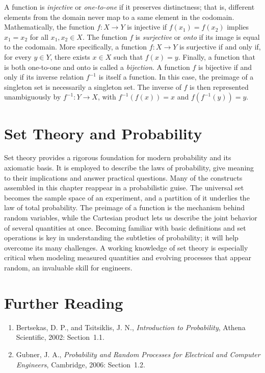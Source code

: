 A function is \emph{injective} or \emph{one-to-one} if it preserves distinctness;
that is, different elements from the domain never map to a same element in the codomain.
Mathematically, the function $f: X \rightarrow Y$ is injective if $f(x_1) = f(x_2)$ implies $x_1 = x_2$ for all $x_1, x_2 \in X$.
The function $f$ is \emph{surjective} or \emph{onto} if its image is equal to the codomain.
More specifically, a function $f: X \rightarrow Y$ is surjective if and only if, for every $y \in Y$, there exists $x \in X$ such that $f(x) = y$.
Finally, a function that is both one-to-one and onto is called a \emph{bijection}.
A function $f$ is bijective if and only if its inverse relation $f^{-1}$ is itself a function.
In this case, the preimage of a singleton set is necessarily a singleton set.
The inverse of $f$ is then represented unambiguously by $f^{-1}: Y \rightarrow X$,
with $f^{-1} (f(x)) = x$ and $f (f^{-1} (y)) = y$.


\section{Set Theory and Probability}

Set theory provides a rigorous foundation for modern probability and its axiomatic basis.
It is employed to describe the laws of probability, give meaning to their implications and answer practical questions.
Many of the constructs assembled in this chapter reappear in a probabilistic guise.
The universal set becomes the sample space of an experiment, and a partition of it underlies the law of total probability.
The preimage of a function is the mechanism behind random variables, while the Cartesian product lets us describe the joint behavior of several quantities at once.
Becoming familiar with basic definitions and set operations is key in understanding the subtleties of probability; it will help overcome its many challenges.
A working knowledge of set theory is especially critical when modeling measured quantities and evolving processes that appear random, an invaluable skill for engineers.


\section*{Further Reading}

\begin{small}
\begin{enumerate}
\item Bertsekas, D. P., and Tsitsiklis, J. N., \emph{Introduction to Probability}, Athena Scientific, 2002: Section~1.1.
\item Gubner, J. A., \emph{Probability and Random Processes for Electrical and Computer Engineers}, Cambridge, 2006: Section~1.2.
\end{enumerate}
\end{small}

